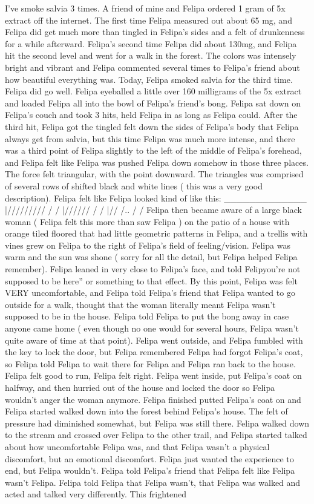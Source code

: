 \documentclass[12pt]{book}
\begin{document}
I've smoke salvia 3 times. A friend of mine and Felipa ordered 1 gram of 5x extract off the internet. The first time Felipa measured out about 65 mg, and Felipa did get much more than tingled in Felipa's sides and a felt of drunkenness for a while afterward. Felipa's second time Felipa did about 130mg, and Felipa hit the second level and went for a walk in the forest. The colors was intensely bright and vibrant and Felipa commented several times to Felipa's friend about how beautiful everything was. Today, Felipa smoked salvia for the third time. Felipa did go well. Felipa eyeballed a little over 160 milligrams of the 5x extract and loaded Felipa all into the bowl of Felipa's friend's bong. Felipa sat down on Felipa's couch and took 3 hits, held Felipa in as long as Felipa could. After the third hit, Felipa got the tingled felt down the sides of Felipa's body that Felipa always get from salvia, but this time Felipa was much more intense, and there was a third point of Felipa slightly to the left of the middle of Felipa's forehead, and Felipa felt like Felipa was pushed Felipa down somehow in those three places. The force felt triangular, with the point downward. The triangles was comprised of several rows of shifted black and white lines ( this was a very good description). Felipa felt like Felipa looked kind of like this: \_\_\_\_\_\_\_\_\_\_\_\_\_ |///////// / / |////// / / |// /.. / / Felipa then became aware of a large black woman ( Felipa felt this more than saw Felipa ) on the patio of a house with orange tiled floored that had little geometric patterns in Felipa, and a trellis with vines grew on Felipa to the right of Felipa's field of feeling/vision. Felipa was warm and the sun was shone ( sorry for all the detail, but Felipa helped Felipa remember). Felipa leaned in very close to Felipa's face, and told Felipyou're not supposed to be here'' or something to that effect. By this point, Felipa was felt VERY uncomfortable, and Felipa told Felipa's friend that Felipa wanted to go outside for a walk, thought that the woman literally meant Felipa wasn't supposed to be in the house. Felipa told Felipa to put the bong away in case anyone came home ( even though no one would for several hours, Felipa wasn't quite aware of time at that point). Felipa went outside, and Felipa fumbled with the key to lock the door, but Felipa remembered Felipa had forgot Felipa's coat, so Felipa told Felipa to wait there for Felipa and Felipa ran back to the house. Felipa felt good to run, Felipa felt right. Felipa went inside, put Felipa's coat on halfway, and then hurried out of the house and locked the door so Felipa wouldn't anger the woman anymore. Felipa finished putted Felipa's coat on and Felipa started walked down into the forest behind Felipa's house. The felt of pressure had diminished somewhat, but Felipa was still there. Felipa walked down to the stream and crossed over Felipa to the other trail, and Felipa started talked about how uncomfortable Felipa was, and that Felipa wasn't a physical discomfort, but an emotional discomfort. Felipa just wanted the experience to end, but Felipa wouldn't. Felipa told Felipa's friend that Felipa felt like Felipa wasn't Felipa. Felipa told Felipa that Felipa wasn't, that Felipa was walked and acted and talked very differently. This frightened 
\end{document}
